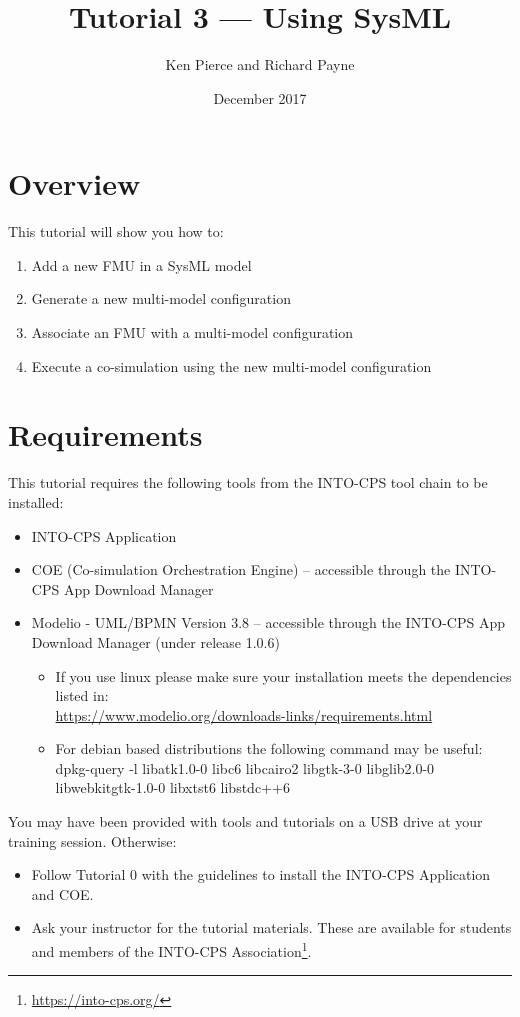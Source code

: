 \documentclass[11pt,a4paper]{../tutorial}
\title{Tutorial 3 --- Using SysML}
\date{December 2017}
\author{Ken Pierce and Richard Payne}
\begin{document}
\section*{Overview}

This tutorial will show you how to:

\begin{enumerate}[noitemsep]
\item Add a new FMU in a SysML model
\item Generate a new multi-model configuration
\item Associate an FMU with a multi-model configuration
\item Execute a co-simulation using the new multi-model configuration
\end{enumerate}

\section*{Requirements}

This tutorial requires the following tools from the INTO-CPS tool chain to be installed:

\begin{itemize}[noitemsep]
\item INTO-CPS Application
\item COE (Co-simulation Orchestration Engine) -- accessible through the INTO-CPS App Download Manager
\item Modelio - UML/BPMN Version 3.8 -- accessible through the INTO-CPS App Download Manager (under release 1.0.6)
	\begin{small}
	\begin{itemize}
		\item If you use linux please make sure your installation meets the dependencies listed in:\\ \url{https://www.modelio.org/downloads-links/requirements.html}
		\item For debian based distributions the following command may be useful:\\
		dpkg-query -l  libatk1.0-0 libc6 libcairo2 libgtk-3-0 libglib2.0-0 libwebkitgtk-1.0-0 libxtst6 libstdc++6
	\end{itemize}
	\end{small}
\end{itemize}

You may have been provided with tools and tutorials on a USB drive at your training session. Otherwise: 
\begin{itemize}[noitemsep]
\item Follow Tutorial 0 with the guidelines to install the INTO-CPS Application and COE.
\item Ask your instructor for the tutorial materials. These are available for students and members of the INTO-CPS Association\footnote{\url{https://into-cps.org/}}.
\end{itemize}
\end{document}
